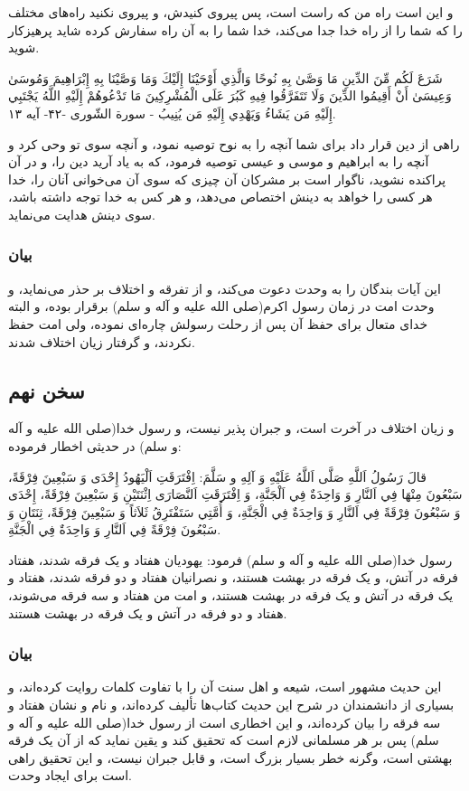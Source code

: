 و این است راه من که راست است، پس پیروی کنیدش، و پیروی نکنید راه‌های
مختلف را که شما را از راه خدا جدا می‌کند، خدا شما را به آن راه سفارش
کرده شاید پرهیزکار شوید.

شَرَعَ لَكُم مِّنَ الدِّينِ مَا وَصَّىٰ بِهِ نُوحًا وَالَّذِي أَوْحَيْنَا إِلَيْكَ وَمَا وَصَّيْنَا بِهِ إِبْرَاهِيمَ
وَمُوسَىٰ وَعِيسَىٰ أَنْ أَقِيمُوا الدِّينَ وَلَا تَتَفَرَّقُوا فِيهِ كَبُرَ عَلَى الْمُشْرِكِينَ مَا تَدْعُوهُمْ
إِلَيْهِ اللَّهُ يَجْتَبِي إِلَيْهِ مَن يَشَاءُ وَيَهْدِي إِلَيْهِ مَن يُنِيبُ - سورة الشّوری -۴۲- آیه
۱۳.

راهی از دین قرار داد برای شما آنچه را به نوح توصیه نمود، و آنچه سوی تو
وحی کرد و آنچه را به ابراهیم و موسی و عیسی توصیه فرمود، که به یاد آرید
دین را، و در آن پراکنده نشوید، ناگوار است بر مشرکان آن چیزی که سوی آن
می‌خوانی آنان را، خدا هر کسی را خواهد به دینش اختصاص می‌دهد، و هر کس به
خدا توجه داشته باشد، سوی دینش هدایت می‌نماید.

\subsubsection*{بیان}

این آیات بندگان را به وحدت دعوت می‌کند، و از تفرقه و اختلاف بر حذر
می‌نماید، و وحدت امت در زمان رسول اکرم(صلی الله علیه و آله و سلم)
برقرار بوده، و البته خدای متعال برای حفظ آن پس از رحلت رسولش چاره‌ای
نموده، ولی امت حفظ نکردند، و گرفتار زیان اختلاف شدند.

\subsection*{سخن نهم}

و زیان اختلاف در آخرت است، و جبران پذیر نیست، و رسول خدا(صلی الله علیه
و آله و سلم) در حدیثی اخطار فرموده:

قالَ رَسُولُ اَللَّهِ صَلَّى اَللَّهُ عَلَيْهِ وَ آلِهِ و سَلَّمَ: اِفْتَرَقَتِ اَلْيَهُودُ إِحْدَى وَ سَبْعِينَ
فِرْقَةً، سَبْعُونَ مِنْهَا فِي اَلنَّارِ وَ وَاحِدَةٌ فِي اَلْجَنَّةِ، وَ اِفْتَرَقَتِ اَلنَّصَارَى اِثْنَتَيْنِ وَ
سَبْعِينَ فِرْقَةً، إِحْدَى وَ سَبْعُونَ فِرْقَةً فِي اَلنَّارِ وَ وَاحِدَةٌ فِي الْجَنَّةِ، وَ أُمَّتِي سَتَفْتَرِقُ
ثَلاَثاً وَ سَبْعِينَ فِرْقَةً، ثِنَتَانِ وَ سَبْعُونَ فِرْقَةً فِي اَلنَّارِ وَ وَاحِدَةٌ فِي الْجَنَّةِ.


رسول خدا(صلی الله علیه و آله و سلم) فرمود: یهودیان هفتاد و یک فرقه
شدند، هفتاد فرقه در آتش، و یک فرقه در بهشت هستند، و نصرانیان هفتاد و
دو فرقه شدند، هفتاد و یک فرقه در آتش و یک فرقه در بهشت هستند، و امت من
هفتاد و سه فرقه می‌شوند، هفتاد و دو فرقه در آتش و یک فرقه در بهشت
هستند.

\subsubsection*{بیان}

این حدیث مشهور است، شیعه و اهل سنت آن را با تفاوت کلمات روایت کرده‌اند،
و بسیاری از دانشمندان در شرح این حدیث کتاب‌ها تألیف کرده‌اند، و نام و
نشان هفتاد و سه فرقه را بیان کرده‌اند، و این اخطاری است از رسول خدا(صلی
الله علیه و آله و سلم) پس بر هر مسلمانی لازم است که تحقیق کند و یقین
نماید که از آن یک فرقه بهشتی است، وگرنه خطر بسیار بزرگ است، و قابل
جبران نیست، و این تحقیق راهی است برای ایجاد وحدت.
